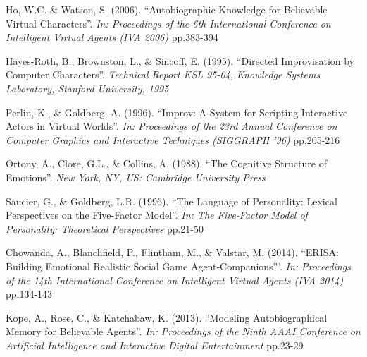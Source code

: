 \documentclass{sig-alternate-05-2015}
\begin{document}
\begin{thebibliography}{20}
Ho, W.C. \& Watson, S. (2006).
``Autobiographic Knowledge for Believable Virtual Characters''.
\textit{In: Proceedings of the 6th International Conference on Intelligent Virtual Agents (IVA 2006)} pp.383-394

Hayes-Roth, B., Brownston, L., \& Sincoff, E. (1995).
``Directed Improvisation by Computer Characters''.
\textit{Technical Report KSL 95-04, Knowledge Systems Laboratory, Stanford University, 1995}

Perlin, K., \& Goldberg, A. (1996).
``Improv: A System for Scripting Interactive Actors in Virtual Worlds''.
\textit{In: Proceedings of the 23rd Annual Conference on Computer Graphics and Interactive Techniques (SIGGRAPH '96)} pp.205-216

Ortony, A., Clore, G.L., \& Collins, A. (1988).
``The Cognitive Structure of Emotions''.
\textit{New York, NY, US: Cambridge University Press}

Saucier, G., \& Goldberg, L.R. (1996).
``The Language of Personality: Lexical Perspectives on the Five-Factor Model''.
\textit{In: The Five-Factor Model of Personality:
Theoretical Perspectives} pp.21-50

Chowanda, A., Blanchfield, P., Flintham, M., \& Valstar, M. (2014). 
``ERISA: Building Emotional Realistic Social Game Agent-Companions'''.
\textit{In: Proceedings of the 14th International Conference on Intelligent Virtual Agents (IVA 2014)} pp.134-143 

Kope, A., Rose, C., \& Katchabaw, K. (2013).
``Modeling Autobiographical Memory for Believable Agents''.
\textit{In: Proceedings of the Ninth AAAI Conference on Artificial Intelligence and Interactive Digital Entertainment} pp.23-29




\end{thebibliography}
 
\end{document}
